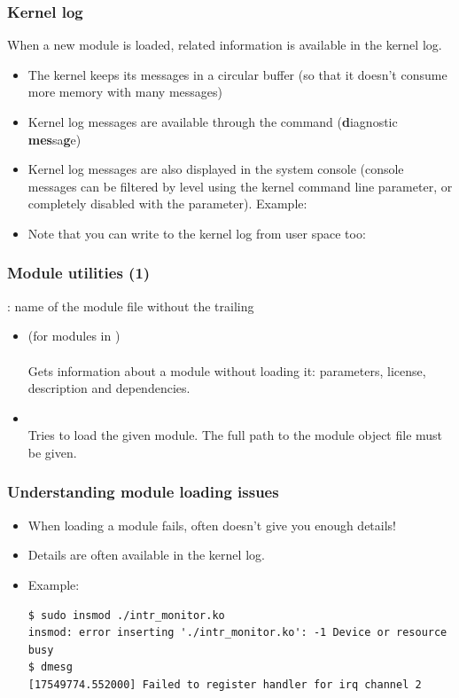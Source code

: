\begin{frame}
  \frametitle{Kernel log}

  When a new module is loaded, related information is available in the
  kernel log.
  \begin{itemize}
  \item The kernel keeps its messages in a circular buffer (so that it
    doesn't consume more memory with many messages)
  \item Kernel log messages are available through the 
    command ({\bf d}iagnostic {\bf mes}sa{\bf g}e)
  \item Kernel log messages are also displayed in the system console
    (console messages can be filtered by level using the
     kernel command line parameter,
     or completely disabled with the
     parameter). Example:\\
  \item Note that you can write to the kernel log from user space too:\\
  \end{itemize}
\end{frame}

\begin{frame}
  \frametitle{Module utilities (1)}
  : name of the module file without the trailing \\
  \begin{itemize}
  \item {} (for modules in )\\
    \\
    Gets information about a module without loading it: parameters, license,
    description and dependencies.\\
  \item {}\\
    Tries to load the given module. The full path to the module object
    file must be given.
  \end{itemize}
\end{frame}

\begin{frame}[fragile]
  \frametitle{Understanding module loading issues}
  \begin{itemize}
  \item When loading a module fails,  often doesn't give
    you enough details!
  \item Details are often available in the kernel log.
  \item Example:\\
\scriptsize
\begin{verbatim}
$ sudo insmod ./intr_monitor.ko
insmod: error inserting './intr_monitor.ko': -1 Device or resource busy
$ dmesg
[17549774.552000] Failed to register handler for irq channel 2
\end{verbatim}
  \end{itemize}
\end{frame}

